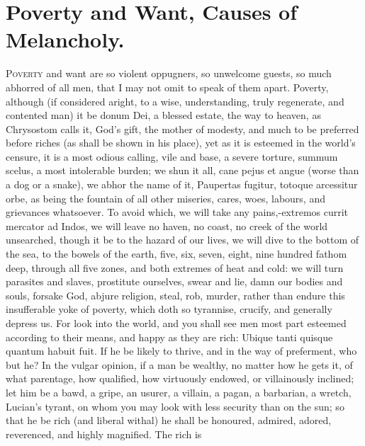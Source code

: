 {%
\clearpage{}
\thispagestyle{titleontop}
\section{Poverty and Want, Causes of Melancholy.}

\lettrine{P}{overty} and want are so violent oppugners, so unwelcome guests, so much
abhorred of all men, that I may not omit to speak of them apart.
Poverty, although (if considered aright, to a wise, understanding,
truly regenerate, and contented man) it be donum Dei, a blessed estate,
the way to heaven, as Chrysostom calls it, God's gift, the mother
of modesty, and much to be preferred before riches (as shall be shown
in his place), yet as it is esteemed in the world's censure, it
is a most odious calling, vile and base, a severe torture, summum
scelus, a most intolerable burden; we shun it all, cane pejus et
angue (worse than a dog or a snake), we abhor the name of it,
Paupertas fugitur, totoque arcessitur orbe, as being the fountain
of all other miseries, cares, woes, labours, and grievances whatsoever.
To avoid which, we will take any pains,-extremos currit mercator ad
Indos, we will leave no haven, no coast, no creek of the world
unsearched, though it be to the hazard of our lives, we will dive to
the bottom of the sea, to the bowels of the earth, five, six,
seven, eight, nine hundred fathom deep, through all five zones, and
both extremes of heat and cold: we will turn parasites and slaves,
prostitute ourselves, swear and lie, damn our bodies and souls, forsake
God, abjure religion, steal, rob, murder, rather than endure this
insufferable yoke of poverty, which doth so tyrannise, crucify, and
generally depress us.
For look into the world, and you shall see men most part esteemed
according to their means, and happy as they are rich: Ubique
tanti quisque quantum habuit fuit. If he be likely to thrive, and in
the way of preferment, who but he? In the vulgar opinion, if a man be
wealthy, no matter how he gets it, of what parentage, how qualified,
how virtuously endowed, or villainously inclined; let him be a bawd, a
gripe, an usurer, a villain, a pagan, a barbarian, a wretch,
Lucian's tyrant, on whom you may look with less security than on
the sun; so that he be rich (and liberal withal) he shall be honoured,
admired, adored, reverenced, and highly magnified. The rich is
}
